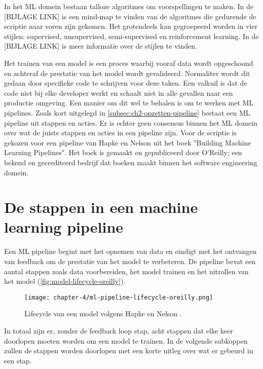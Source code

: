 In het ML domein bestaan talloze algoritmes om voorspellingen te maken. In de [BIJLAGE LINK] is een mind-map te vinden van de algoritmes die gedurende de scriptie naar voren zijn gekomen. Het grotendeels kan gegroepeerd worden in vier stijlen: supervised, unsupervised, semi-supervised en reinforcement learning. In de [BIJLAGE LINK] is meer informatie over de stijlen te vinden.

Het trainen van een model is een proces waarbij vooraf data wordt opgeschoond en achteraf de prestatie van het model wordt gevalideerd. Normaliter wordt dit gedaan door specifieke code te schrijven voor deze taken. Een valkuil is dat de code niet bij elke developer werkt en schaalt niet in alle gevallen naar een productie omgeving. Een manier om dit wel te behalen is om te werken met ML pipelines. Zoals kort uitgelegd in \autoref{subsec:ch2-opzetten-pipeline} bestaat een ML pipeline uit stappen en acties. Er is echter geen consensus binnen het ML domein over wat de juiste stappen en acties in een pipeline zijn. Voor de scriptie is gekozen voor een pipeline van Hapke en Nelson uit het boek "Building Machine Learning Pipelines". Het boek is gemaakt en gepubliceerd door O'Reilly; een bekend en gecrediteerd bedrijf dat boeken maakt binnen het software engineering domein.

\section{De stappen in een machine learning pipeline}\label{sec:ch4-de-stappen-in-een-machine-learning-pipeline}
Een ML pipeline begint met het opnemen van data en eindigt met het ontvangen van feedback om de prestatie van het model te verbeteren. De pipeline bevat een aantal stappen zoals data voorbereiden, het model trainen en het uitrollen van het model (\autoref{fig:model-lifecycle-oreilly}).

\begin{figure}[hbt!]
  \centering
  \texttt{[image: chapter-4/ml-pipeline-lifecycle-oreilly.png]}
  \caption{Lifecycle van een model volgens Hapke en Nelson \cite[p.~4]{building-machine-learning-pipelines-oreilly}.}
  \label{fig:model-lifecycle-oreilly}
\end{figure}

In totaal zijn er, zonder de feedback loop stap, acht stappen dat elke keer doorlopen moeten worden om een model te trainen. In de volgende subkoppen zullen de stappen worden doorlopen met een korte uitleg over wat er gebeurd in een stap. 

